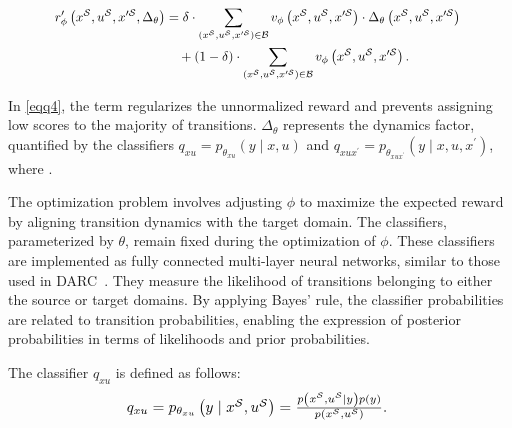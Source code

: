 \begin{equation}
\label{eqq4}
\resizebox{0.85\hsize}{!}{%
\begin{math}
\begin{split}
r_\phi^{\prime}\left(x^{\mathcal{S}}, u^{\mathcal{S}}, x^{\prime \mathcal{S}}, \Delta_\theta\right) &= \delta \cdot \sum_{\left(x^{\mathcal{S}}, u^{\mathcal{S}}, x^{\prime \mathcal{S}}\right) \in \mathcal{B}} v_\phi\left(x^{\mathcal{S}}, u^{\mathcal{S}}, x^{\prime \mathcal{S}}\right) \cdot \Delta_\theta\left(x^{\mathcal{S}}, u^{\mathcal{S}}, x^{\prime \mathcal{S}}\right) \\
&\quad + (1-\delta) \cdot \sum_{\left(x^{\mathcal{S}}, u^{\mathcal{S}}, x^{\prime \mathcal{S}}\right) \in \mathcal{B}} v_\phi\left(x^{\mathcal{S}}, u^{\mathcal{S}}, x^{\prime \mathcal{S}}\right).
\end{split}
\end{math}
}
\end{equation}


In \autoref{eqq4}, the term  regularizes the unnormalized reward and prevents assigning low scores to the majority of transitions. \(\Delta_\theta\) represents the dynamics factor, quantified by the classifiers \(q_{xu} = p_{\theta_{xu}}(y \mid x, u)\) and \(q_{xu{x}^{\prime}} = p_{\theta_{xu{x}^{\prime}}}(y \mid x, u, {x}^{\prime})\), where . 


The optimization problem involves adjusting \(\phi\) to maximize the expected reward by aligning transition dynamics with the target domain. The classifiers, parameterized by \(\theta\), remain fixed during the optimization of \(\phi\). These classifiers are implemented as fully connected multi-layer neural networks, similar to those used in DARC~\citep{eysenbach2020off}. They measure the likelihood of transitions belonging to either the source or target domains. By applying Bayes' rule, the classifier probabilities are related to transition probabilities, enabling the expression of posterior probabilities in terms of likelihoods and prior probabilities. 

The classifier \(q_{xu}\) is defined as follows:
\begin{equation}
\label{qxu}
\resizebox{0.55\hsize}{!}{%
\begin{math}
q_{xu} = p_{\theta_{x u}}\left(y \mid x^{\mathcal{S}}, u^{\mathcal{S}}\right)=\frac{p\left(x^{\mathcal{S}}, u^{\mathcal{S}} \mid y\right) p(y)}{p\left(x^{\mathcal{S}}, u^{\mathcal{S}}\right)}.
\end{math}
}
\end{equation}

